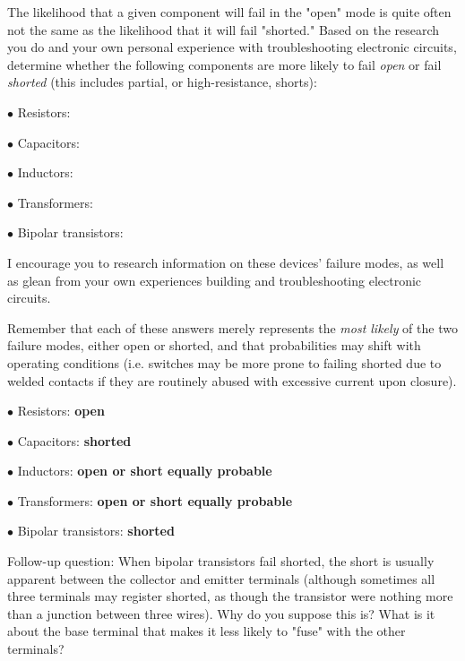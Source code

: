 

The likelihood that a given component will fail in the "open" mode is quite often not the same as the likelihood that it will fail "shorted."  Based on the research you do and your own personal experience with troubleshooting electronic circuits, determine whether the following components are more likely to fail {\it open} or fail {\it shorted} (this includes partial, or high-resistance, shorts):

\medskip
\item{$\bullet$} Resistors:
\item{$\bullet$} Capacitors:
\item{$\bullet$} Inductors:
\item{$\bullet$} Transformers:
\item{$\bullet$} Bipolar transistors:
\medskip

I encourage you to research information on these devices' failure modes, as well as glean from your own experiences building and troubleshooting electronic circuits.







Remember that each of these answers merely represents the {\it most likely} of the two failure modes, either open or shorted, and that probabilities may shift with operating conditions (i.e. switches may be more prone to failing shorted due to welded contacts if they are routinely abused with excessive current upon closure).

\medskip
\item{$\bullet$} Resistors: {\bf open}
\item{$\bullet$} Capacitors: {\bf shorted}
\item{$\bullet$} Inductors: {\bf open or short equally probable}
\item{$\bullet$} Transformers: {\bf open or short equally probable}
\item{$\bullet$} Bipolar transistors: {\bf shorted}
\medskip

Follow-up question: When bipolar transistors fail shorted, the short is usually apparent between the collector and emitter terminals (although sometimes all three terminals may register shorted, as though the transistor were nothing more than a junction between three wires).  Why do you suppose this is?  What is it about the base terminal that makes it less likely to "fuse" with the other terminals?

